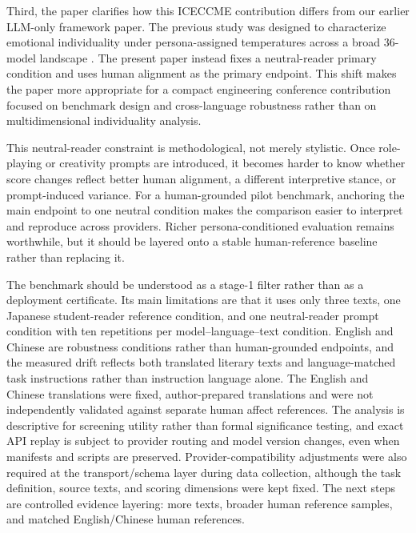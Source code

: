 \documentclass[conference,a4paper]{IEEEtran}
\begin{document}
Third, the paper clarifies how this ICECCME contribution differs from our earlier LLM-only framework paper. The previous study was designed to characterize emotional individuality under persona-assigned temperatures across a broad 36-model landscape \cite{shirahama2026mdpi}. The present paper instead fixes a neutral-reader primary condition and uses human alignment as the primary endpoint. This shift makes the paper more appropriate for a compact engineering conference contribution focused on benchmark design and cross-language robustness rather than on multidimensional individuality analysis.

This neutral-reader constraint is methodological, not merely stylistic. Once role-playing or creativity prompts are introduced, it becomes harder to know whether score changes reflect better human alignment, a different interpretive stance, or prompt-induced variance. For a human-grounded pilot benchmark, anchoring the main endpoint to one neutral condition makes the comparison easier to interpret and reproduce across providers. Richer persona-conditioned evaluation remains worthwhile, but it should be layered onto a stable human-reference baseline rather than replacing it.

The benchmark should be understood as a stage-1 filter rather than as a deployment certificate. Its main limitations are that it uses only three texts, one Japanese student-reader reference condition, and one neutral-reader prompt condition with ten repetitions per model--language--text condition. English and Chinese are robustness conditions rather than human-grounded endpoints, and the measured drift reflects both translated literary texts and language-matched task instructions rather than instruction language alone. The English and Chinese translations were fixed, author-prepared translations and were not independently validated against separate human affect references. The analysis is descriptive for screening utility rather than formal significance testing, and exact API replay is subject to provider routing and model version changes, even when manifests and scripts are preserved. Provider-compatibility adjustments were also required at the transport/schema layer during data collection, although the task definition, source texts, and scoring dimensions were kept fixed. The next steps are controlled evidence layering: more texts, broader human reference samples, and matched English/Chinese human references.
\end{document}
